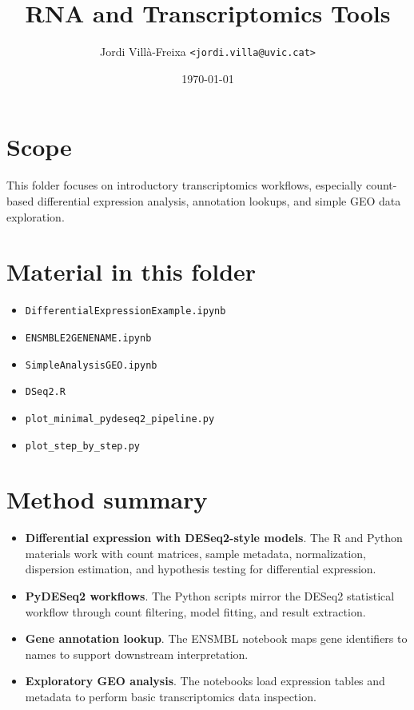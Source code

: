 \documentclass[11pt,a4paper]{article}
\title{RNA and Transcriptomics Tools}
\author{Jordi Vill\`a-Freixa \texttt{<jordi.villa@uvic.cat>}}
\date{\today}
\begin{document}
    \maketitle

    \section*{Scope}
    This folder focuses on introductory transcriptomics workflows, especially count-based differential expression analysis, annotation lookups, and simple GEO data exploration.

    \section*{Material in this folder}
    \begin{itemize}[leftmargin=*]
\item \texttt{DifferentialExpressionExample.ipynb}
\item \texttt{ENSMBLE2GENENAME.ipynb}
\item \texttt{SimpleAnalysisGEO.ipynb}
\item \texttt{DSeq2.R}
\item \texttt{plot\_minimal\_pydeseq2\_pipeline.py}
\item \texttt{plot\_step\_by\_step.py}
    \end{itemize}

    \section*{Method summary}
    \begin{itemize}[leftmargin=*]
\item \textbf{Differential expression with DESeq2-style models}. The R and Python materials work with count matrices, sample metadata, normalization, dispersion estimation, and hypothesis testing for differential expression.
\item \textbf{PyDESeq2 workflows}. The Python scripts mirror the DESeq2 statistical workflow through count filtering, model fitting, and result extraction.
\item \textbf{Gene annotation lookup}. The ENSMBL notebook maps gene identifiers to names to support downstream interpretation.
\item \textbf{Exploratory GEO analysis}. The notebooks load expression tables and metadata to perform basic transcriptomics data inspection.
    \end{itemize}
\end{document}
